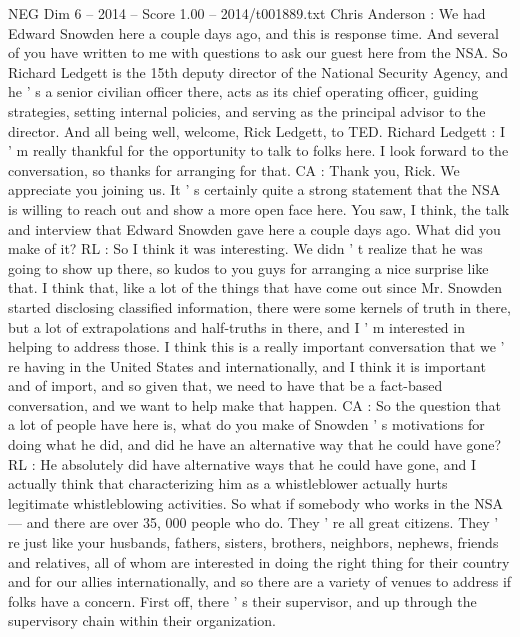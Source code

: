 \begin{textsample}{NEG Dim 6 – 2014 – Score 1.00 – 2014/t001889.txt}  \label{ex:f6_neg_032}
Chris Anderson : We had Edward Snowden here a couple days ago, and this is response time.
And several of you have written to me with questions to ask our guest here from the NSA.
So Richard Ledgett is the 15th deputy director of the National Security Agency, and he ' s a senior civilian officer there, acts as its chief operating officer, guiding strategies, setting internal policies, and serving as the principal advisor to the director.
And all being well, welcome, Rick Ledgett, to TED.
Richard Ledgett : I ' m really thankful for the opportunity to talk to folks here.
I look forward to the conversation, so thanks for arranging for that.
CA : Thank you, Rick.
We appreciate you joining us.
It ' s certainly quite a strong statement that the NSA is willing to reach out and show a more open face here.
You saw, I think, the talk and interview that Edward Snowden gave here a couple days ago.
What did you make of it?
RL : So I think it was interesting.
We didn ' t realize that he was going to show up there, so kudos to you guys for arranging a nice surprise like that.
I think that, like a lot of the things that have come out since Mr.
Snowden started disclosing classified information, there were some kernels of truth in there, but a lot of extrapolations and half-truths in there, and I ' m interested in helping to address those.
I think this is a really important conversation that we ' re having in the United States and internationally, and I think it is important and of import, and so given that, we need to have that be a fact-based conversation, and we want to help make that happen.
CA : So the question that a lot of people have here is, what do you make of Snowden ' s motivations for doing what he did, and did he have an alternative way that he could have gone?
RL : He absolutely did have alternative ways that he could have gone, and I actually think that characterizing him as a whistleblower actually hurts legitimate whistleblowing activities.
So what if somebody who works in the NSA — and there are over 35, 000 people who do.
They ' re all great citizens.
They ' re just like your husbands, fathers, sisters, brothers, neighbors, nephews, friends and relatives, all of whom are interested in doing the right thing for their country and for our allies internationally, and so there are a variety of venues to address if folks have a concern.
First off, there ' s their supervisor, and up through the supervisory chain within their organization.

\end{textsample}
